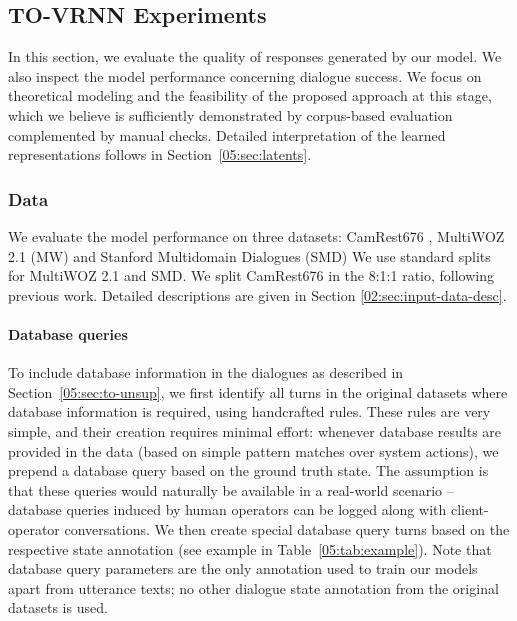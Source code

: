 \subsection{TO-VRNN Experiments}
In this section, we evaluate the quality of responses generated by our model.
We also inspect the model performance concerning dialogue success.
We focus on theoretical modeling and the feasibility of the proposed approach at this stage, which we believe is sufficiently demonstrated by corpus-based evaluation complemented by manual checks. Detailed interpretation of the learned representations follows in Section~\ref{05:sec:latents}.

\subsubsection{Data}
\label{05:sec:data}

We evaluate the model performance on three datasets: CamRest676 \cite{wen2016network}, MultiWOZ 2.1 (MW)\cite{budzianowski2018multiwoz,eric2019multiwoz} and Stanford Multidomain Dialogues (SMD) \cite{eric-etal-2017-key}
We use standard splits for MultiWOZ 2.1 and SMD.
We split CamRest676 in the 8:1:1 ratio, following previous work.
Detailed descriptions are given in Section \ref{02:sec:input-data-desc}.

\paragraph{Database queries} To include database information in the dialogues as described in Section~\ref{05:sec:to-unsup}, we first identify all turns in the original datasets where database information is required, using handcrafted rules.
These rules are very simple, and their creation requires minimal effort: whenever database results are provided in the data (based on simple pattern matches over system actions), we prepend a database query based on the ground truth state. The assumption is that these queries would naturally be available in a real-world scenario -- database queries induced by human operators can be logged along with client-operator conversations.
We then create special database query turns based on the respective state annotation (see example in Table~\ref{05:tab:example}).
Note that database query parameters are the only annotation used to train our models apart from utterance texts; no other dialogue state annotation from the original datasets is used.

